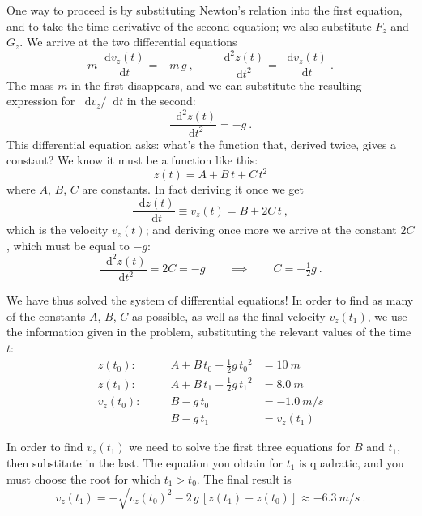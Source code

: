\documentclass[a4paper,12pt,%
onecolumn,oneside,%
british%
]{memoir}
\newcommand*{\di}{\mathop{}\!\mathrm{d}}%
\renewcommand*{\|}[1][]{\nonscript\:#1\vert\nonscript\:\mathopen{}}
\newcommand*{\yti}{t_{0}}
\newcommand*{\ytf}{t_{1}}
\newcommand*{\dt}{\di t}
\newcommand*{\ym}{m}%
\begin{document}
One way to proceed is by substituting Newton's relation into the first equation, and to take the time derivative of the second equation; we also substitute $F_{z}$ and $G_{z}$. We arrive at the two differential equations
\begin{equation*}
    \ym\frac{\di v_{z}(t)}{\dt} = -\ym\,g \ ,
    \qquad
 \frac{\di^{2} z(t)}{\dt^{2}} = \frac{\di v_{z}(t)}{\dt} \ .
\end{equation*}
The mass $\ym$ in the first disappears, and we can substitute the resulting expression for $\di v_{z}/\dt$ in the second:
\begin{equation*}
 \frac{\di^{2} z(t)}{\dt^{2}} = -g \ .
\end{equation*}
This differential equation asks: what's the function that, derived twice, gives a constant? We know it must be a function like this:
\begin{equation*}
  z(t) = A + B\,t + C\,t^{2}
\end{equation*}
where $A$, $B$, $C$ are constants. In fact deriving it once we get
\begin{equation*}
  \frac{\di z(t)}{\dt} \equiv v_{z}(t) = B + 2C\,t \ ,
\end{equation*}
which is the velocity $v_{z}(t)$; and deriving once more we arrive at the constant $2C$, which must be equal to $-g$:
\begin{equation*}
  \frac{\di^{2} z(t)}{\dt^{2}} = 2C = -g
  \qquad\implies\qquad
  C = -\tfrac12 g \ .
\end{equation*}

We have thus solved the system of differential equations! In order to find as many of the constants $A$, $B$, $C$ as possible, as well as the final velocity $v_{z}(\ytf)$, we use the information given in the problem, substituting the relevant values of the time $t$:
\begin{equation*}
  \begin{aligned}
    z(\yti):&\quad & A + B\,\yti - \tfrac12 g\,{\yti}^{2} &= \qty{10}{m}
    \\
    z(\ytf):&\quad & A + B\,\ytf - \tfrac12 g\,{\ytf}^{2} &= \qty{8.0}{m}
    \\
    v_{z}(\yti):&\quad & B - g\,\yti &= -\qty{1.0}{m/s}
    \\
    &&  B - g\,\ytf &= v_{z}(\ytf)
  \end{aligned}
\end{equation*}

In order to find $v_{z}(\ytf)$ we need to solve the first three equations for $B$ and $\ytf$, then substitute in the last. The equation you obtain for $\ytf$ is quadratic, and you must choose the root for which $\ytf > \yti$. The final result is
\begin{equation*}
  v_{z}(\ytf) = -\sqrt{v_{z}(\yti)^{2} - 2\,g\,[z(\ytf) - z(\yti)]}
  \approx -\qty{6.3}{m/s} \ .
\end{equation*}
\end{document}
